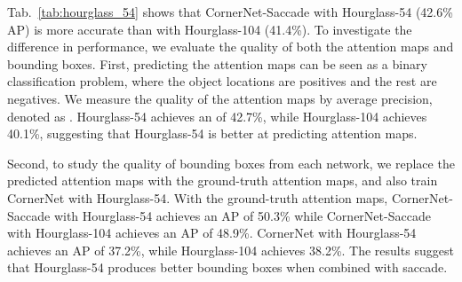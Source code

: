 \documentclass{bmvc2k}
\begin{document}
Tab.~\ref{tab:hourglass_54} shows that CornerNet-Saccade with Hourglass-54 (42.6\% AP) is more accurate than with Hourglass-104 (41.4\%). To investigate the difference in performance, we evaluate the quality of both the attention maps and bounding boxes. First, predicting the attention maps can be seen as a binary classification problem, where the object locations are positives and the rest are negatives. We measure the quality of the attention maps by average precision, denoted as . Hourglass-54 achieves an  of 42.7\%, while Hourglass-104 achieves 40.1\%, suggesting that Hourglass-54 is better at predicting attention maps. 

Second, to study the quality of bounding boxes from each network, we replace the predicted attention maps with the ground-truth attention maps, and also train CornerNet with Hourglass-54. With the ground-truth attention maps, CornerNet-Saccade with Hourglass-54 achieves an AP of 50.3\% while CornerNet-Saccade with Hourglass-104 achieves an AP of 48.9\%. CornerNet with Hourglass-54 achieves an AP of 37.2\%, while Hourglass-104 achieves 38.2\%. The results suggest that Hourglass-54 produces better bounding boxes when combined with saccade.

\begin{table}
    \centering
    \caption{Ablation study on CornerNet-Squeeze. *Note that CornerNet is trained with a smaller batch size.}
    \label{tab:cornernet_squeeze_ablation}
\end{table}
\end{document}
